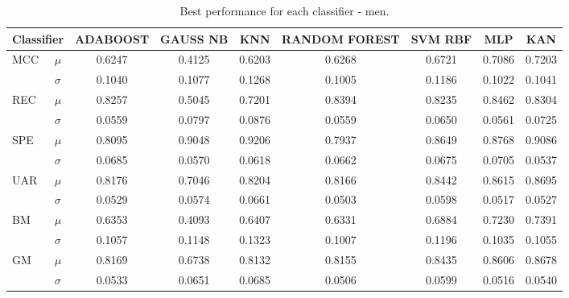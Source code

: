 \begin{table}
\centering
\caption{Best performance for each classifier - men.}
\begin{tabular}{llccccccc}
\toprule
\multicolumn{2}{l}{Classifier} & ADABOOST & GAUSS NB & KNN & RANDOM FOREST & SVM RBF & MLP & KAN \\
\midrule
\multirow{2}{*}{MCC} & $\mu$ & 0.6247 & 0.4125 & 0.6203 & 0.6268 & 0.6721 & 0.7086 & 0.7203 \\
 & $\sigma$ & 0.1040 & 0.1077 & 0.1268 & 0.1005 & 0.1186 & 0.1022 & 0.1041 \\
\midrule
\multirow{2}{*}{REC} & $\mu$ & 0.8257 & 0.5045 & 0.7201 & 0.8394 & 0.8235 & 0.8462 & 0.8304 \\
 & $\sigma$ & 0.0559 & 0.0797 & 0.0876 & 0.0559 & 0.0650 & 0.0561 & 0.0725 \\
\midrule
\multirow{2}{*}{SPE} & $\mu$ & 0.8095 & 0.9048 & 0.9206 & 0.7937 & 0.8649 & 0.8768 & 0.9086 \\
 & $\sigma$ & 0.0685 & 0.0570 & 0.0618 & 0.0662 & 0.0675 & 0.0705 & 0.0537 \\
\midrule
\multirow{2}{*}{UAR} & $\mu$ & 0.8176 & 0.7046 & 0.8204 & 0.8166 & 0.8442 & 0.8615 & 0.8695 \\
 & $\sigma$ & 0.0529 & 0.0574 & 0.0661 & 0.0503 & 0.0598 & 0.0517 & 0.0527 \\
\midrule
\multirow{2}{*}{BM} & $\mu$ & 0.6353 & 0.4093 & 0.6407 & 0.6331 & 0.6884 & 0.7230 & 0.7391 \\
 & $\sigma$ & 0.1057 & 0.1148 & 0.1323 & 0.1007 & 0.1196 & 0.1035 & 0.1055 \\
\midrule
\multirow{2}{*}{GM} & $\mu$ & 0.8169 & 0.6738 & 0.8132 & 0.8155 & 0.8435 & 0.8606 & 0.8678 \\
 & $\sigma$ & 0.0533 & 0.0651 & 0.0685 & 0.0506 & 0.0599 & 0.0516 & 0.0540 \\
\bottomrule
\end{tabular}
\label{tab:results_men}
\end{table}
